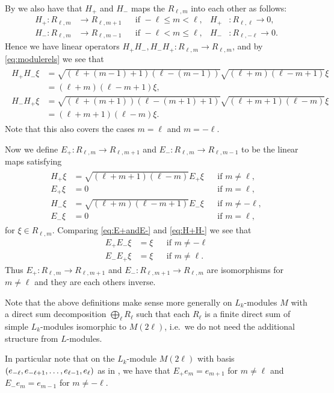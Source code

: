 By  we also have that $H_+$ and $H_-$ maps the $R_{\ell,m}$ into each other as follows:
\begin{align*}
  H_+\colon R_{\ell,m} &\to R_{\ell,m+1} && \mbox{if }-\ell\leq m<\ell, & H_+&\colon R_{\ell,\ell} \to 0, \\
  H_-\colon R_{\ell,m} &\to R_{\ell,m-1} && \mbox{if }-\ell< m\leq \ell, & H_-&\colon R_{\ell,-\ell} \to 0.
\end{align*}
Hence we have linear operators $H_+H_-,H_-H_+\colon R_{\ell,m}\to R_{\ell,m}$, and by \cref{eq:modulerels} we see that
\begin{align}
  \begin{split} \label{eq:H+H-}
    H_+H_-\xi &= \sqrt{(\ell+(m-1)+1)(\ell-(m-1))}\sqrt{(\ell+m)(\ell-m+1)} \xi \\
    &= (\ell+m)(\ell-m+1)\xi, \\
    H_-H_+\xi &= \sqrt{(\ell+(m+1))(\ell-(m+1)+1)}\sqrt{(\ell+m+1)(\ell-m)} \xi \\
    &= (\ell+m+1)(\ell-m)\xi.
  \end{split}
\end{align}
Note that this also covers the cases $m=\ell$ and $m=-\ell$. 

Now we define $E_+ \colon R_{\ell,m}\to R_{\ell,m+1}$ and $E_- \colon R_{\ell,m}\to R_{\ell,m-1}$ to be the linear maps satisfying 
\begin{align}
  \begin{aligned} \label{eq:E+andE-}
    H_+ \xi &= \sqrt{(\ell+m+1)(\ell-m)}E_+\xi && \mbox{if } m\neq \ell, \\
    E_+ \xi &= 0 && \mbox{if } m=\ell, \\
    H_- \xi &= \sqrt{(\ell+m)(\ell-m+1)}E_-\xi && \mbox{if } m\neq -\ell, \\
    E_-\xi &= 0 && \mbox{if } m=\ell,
  \end{aligned}
\end{align}
for $\xi\in R_{\ell,m}$. Comparing \cref{eq:E+andE-} and \cref{eq:H+H-} we see that
\begin{align*}
  E_+E_-\xi &= \xi && \mbox{if }m\neq-\ell \\
  E_-E_+\xi &= \xi && \mbox{if }m\neq\ell.
\end{align*}
Thus $E_+\colon R_{\ell,m}\to R_{\ell,m+1}$ and $E_-\colon R_{\ell,m+1}\to R_{\ell,m}$ are isomorphisms for $m\neq\ell$ and they are each others inverse.
\begin{remark}\label{rem:Edef}
  Note that the above definitions make sense more generally on $L_k$-modules $M$ with a direct sum decomposition $\bigoplus_\ell R_\ell$ such that each $R_\ell$ is a finite direct sum of simple $L_k$-modules isomorphic to $M(2\ell)$, i.e.\ we do not need the additional structure from $L$-modules.

  In particular note that on the $L_k$-module $M(2\ell)$ with basis $(e_{-\ell},e_{-\ell+1},\dotsc,\\ e_{\ell-1},e_\ell)$ as in , we have that $E_+ e_m = e_{m+1}$ for $m\neq\ell$ and $E_- e_m = e_{m-1}$ for $m\neq -\ell$.
\end{remark}

